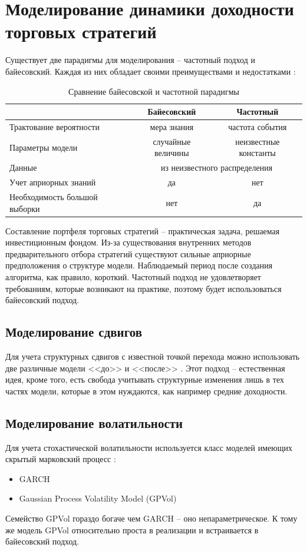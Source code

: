 \chapter{Моделирование динамики доходности торговых стратегий}
Существует две парадигмы для моделирования -- частотный подход и байесовский. Каждая из них обладает своими преимуществами и недостатками \citep{gelman2008}:
\begin{table}[h]
\centering
\caption{Сравнение байесовской и частотной парадигмы}
	\begin{tabular}{l|c|c}
	& Байесовский  & Частотный \\ \hline
	Трактование вероятности & мера знания & частота события \\ \hline
	Параметры модели & случайные величины & неизвестные константы \\ \hline
	Данные & \multicolumn{2}{c}{из неизвестного распределения}  \\ \hline
	Учет априорных знаний & да & нет \\ \hline
	Необходимость большой выборки & нет & да
 	\end{tabular}
\end{table}

Составление портфеля торговых стратегий -- практическая задача, решаемая инвестиционным фондом. Из-за существования внутренних методов предварительного отбора стратегий существуют сильные априорные предположения о структуре модели. Наблюдаемый период после создания алгоритма, как правило, короткий. Частотный подход не удовлетворяет требованиям, которые возникают на практике, поэтому будет использоваться байесовский подход. 
\section{Моделирование сдвигов}
Для учета структурных сдвигов с известной точкой перехода можно использовать две различные модели <<до>> и <<после>> \citep{salazar1982}. Этот подход -- естественная идея, кроме того, есть свобода учитывать структурные изменения лишь в тех частях модели, которые в этом нуждаются, как например средние доходности.

\section{Моделирование волатильности}
Для учета стохастической волатильности используется класс моделей имеющих скрытый марковский процесс \citep{ghahramani2001}:
\begin{itemize}
	\item GARCH \citep{engle1982}
	\item Gaussian Process Volatility Model (GPVol) \citep{han2016}
\end{itemize}
Семейство GPVol гораздо богаче чем GARCH -- оно непараметрическое. К тому же модель GPVol относительно проста в реализации и встраивается в байесовский подход.

